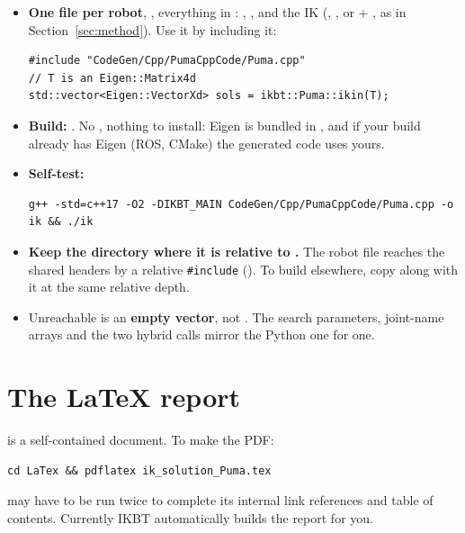 \documentclass[11pt]{article}
\begin{document}
\begin{itemize}
\item \textbf{One file per robot}, ,
  everything in :  , , and
  the IK (, , or  +
  , as in Section~\ref{sec:method}).  Use it by including it:
\begin{lstlisting}
#include "CodeGen/Cpp/PumaCppCode/Puma.cpp"
// T is an Eigen::Matrix4d
std::vector<Eigen::VectorXd> sols = ikbt::Puma::ikin(T);
\end{lstlisting}
\item \textbf{Build:}  .  No
  , nothing to install:  Eigen is bundled in
  , and if your build already has Eigen (ROS,
  CMake) the generated code uses yours.
\item \textbf{Self-test:}
\begin{lstlisting}
g++ -std=c++17 -O2 -DIKBT_MAIN CodeGen/Cpp/PumaCppCode/Puma.cpp -o ik && ./ik
\end{lstlisting}
\item \textbf{Keep the directory where it is relative to .}  The
  robot file reaches the shared headers by a relative \texttt{\#include}
  ().  To build elsewhere, copy  along
  with it at the same relative depth.
\item Unreachable is an \textbf{empty vector}, not .  The search
  parameters, joint-name arrays and the two hybrid calls mirror the Python one
  for one.
\end{itemize}

\section{The LaTeX report}\label{sec:report}

 is a self-contained document.  To make the PDF:

\begin{lstlisting}
cd LaTex && pdflatex ik_solution_Puma.tex
\end{lstlisting}

  may have to be run twice to complete its internal link references and
 table of contents.   Currently IKBT automatically builds the report for you.
\end{document}
